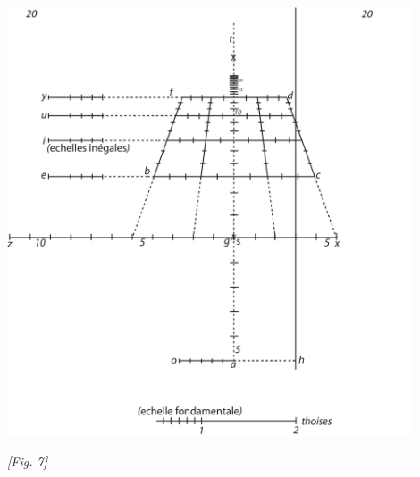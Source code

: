 \begin{center}
\includegraphics[width=0.9\textwidth]{images/T20-Desargues}
\\\rule[-4mm]{0mm}{10mm}\textit{[Fig. 7]}
\end{center}